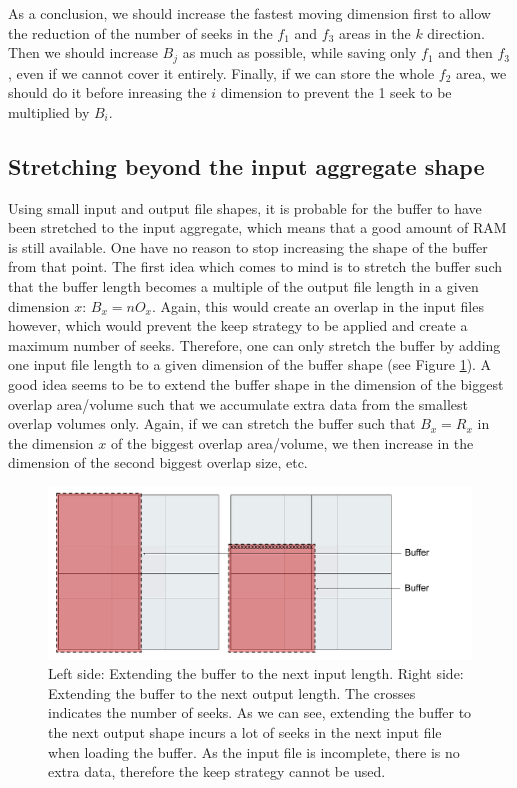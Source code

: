 \documentclass[conference]{IEEEtran}
\begin{document}
As a conclusion, we should increase the fastest moving dimension first to allow the reduction of the number of seeks in the $f_1$ and $f_3$ areas in the $k$ direction.
Then we should increase $B_j$ as much as possible, while saving only $f_1$ and then $f_3$, even if we cannot cover it entirely.
Finally, if we can store the whole $f_2$ area, we should do it before inreasing the $i$ dimension to prevent the 1 seek to be multiplied by $B_i$. \\

\subsection{Stretching beyond the input aggregate shape}
Using small input and output file shapes, it is probable for the buffer to have been stretched to the input aggregate, which means that a good amount of RAM is still available.
One have no reason to stop increasing the shape of the buffer from that point.
The first idea which comes to mind is to stretch the buffer such that the buffer length becomes a multiple of the output file length in a given dimension $x$: $B_x = nO_x$.
Again, this would create an overlap in the input files however, which would prevent the keep strategy to be applied and create a maximum number of seeks.
Therefore, one can only stretch the buffer by adding one input file length to a given dimension of the buffer shape (see Figure \ref{fig:extendingbuffers}).
A good idea seems to be to extend the buffer shape in the dimension of the biggest overlap area/volume such that we accumulate extra data from the smallest overlap volumes only.
Again, if we can stretch the buffer such that $B_x = R_x$ in the dimension $x$ of the biggest overlap area/volume, we then increase in the dimension of the second biggest overlap size, etc.

\begin{figure}[h]
\centering
\includegraphics[scale=0.20]{./figures/extendingbuffers.png}
\caption{ Left side: Extending the buffer to the next input length. Right side: Extending the buffer to the next output length. The crosses indicates the number of seeks. As we can see, extending the buffer to the next output shape incurs a lot of seeks in the next input file when loading the buffer. As the input file is incomplete, there is no extra data, therefore the keep strategy cannot be used.
}
\label{fig:extendingbuffers}
\end{figure}
\end{document}
